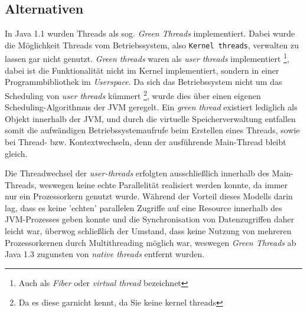 \subsection{Alternativen}
\label{subsec:alternativen}
In Java 1.1 wurden Threads als sog. \textit{Green Threads} implementiert. Dabei wurde die Möglichkeit Threads vom Betriebssystem, also \verb|Kernel threads|,
verwalten zu lassen gar nicht genutzt.
\textit{Green threads} waren als \textit{user threads} implementiert \footnote{Auch als \textit{Fiber} oder \textit{virtual thread} bezeichnet},
dabei ist die Funktionalität
nicht im Kernel implementiert, sondern in einer Programmbibliothek im \textit{Userspace}.
Da sich das Betriebssystem nicht um das Scheduling von \textit{user threads} kümmert
\footnote{Da es diese garnicht kennt, da Sie keine kernel threads}, wurde dies über einen eigenen Scheduling-Algorithmus der JVM
geregelt.\parencite{Oracle2010}
Ein \textit{green thread} existiert lediglich als Objekt innerhalb der JVM, und durch die virtuelle Speicherverwaltung entfallen somit
die aufwändigen Betriebssystemaufrufe beim
Erstellen eines Threads, sowie bei Thread- bzw. Kontextwechseln, denn der ausführende Main-Thread bleibt gleich.

Die Threadwechsel der \textit{user-threads} erfolgten ausschließlich innerhalb des Main-Threads, weswegen keine echte Parallelität realisiert werden konnte,
da immer nur ein Prozessorkern genutzt wurde.
Während der Vorteil dieses Modells darin lag, dass es keine 'echten' parallelen Zugriffe auf eine Resource innerhalb des JVM-Prozesses geben konnte
und die Synchronisation von Datenzugriffen daher leicht war, überwog schließlich der Umstand, dass keine Nutzung von mehreren Prozessorkernen
durch Multithreading möglich war, weswegen \textit{Green Threads} ab Java 1.3 zugunsten von \textit{native threads} entfernt wurden.

